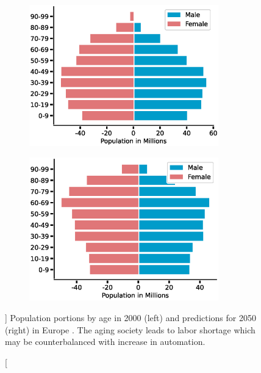 \begin{figure}[h]
  \begin{subfigure}{0.5\textwidth}
    \centering
    \includegraphics[width=0.9\textwidth]{src/introduction/img/population_2000.eps}
  \end{subfigure}%
  \begin{subfigure}{0.5\textwidth}
    \centering
    \includegraphics[width=0.9\textwidth]{src/introduction/img/population_2050.eps}
  \end{subfigure}
  \caption
  []
  {
    Population portions by age in 2000 (left) and predictions for
    2050 (right) in Europe \footnotemark. The aging society leads to labor shortage
    which may be counterbalanced with increase in
    automation.
  }
  \label{fig:demographic_change}
\end{figure}

